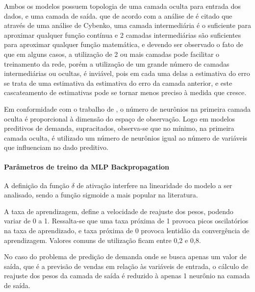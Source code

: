             Ambos os modelos possuem topologia de uma camada oculta para entrada dos dados, e uma camada de saída. que de acordo com  a análise de \cite{Braga2000}  é citado que através de uma análise de Cybenko, uma camada intermediária é o suficiente para aproximar qualquer função contínua e 2 camadas intermediárias são suficientes para aproximar qualquer função matemática, e devendo ser observado o fato de que em alguns casos, a utilização de 2 ou mais camadas pode facilitar o treinamento da rede, porém a utilização de um grande número de camadas intermediárias ou ocultas, é inviável, pois em cada uma delas a estimativa do erro se trata de uma estimativa da estimativa do erro da camada anterior, e este cascateamento de estimativas pode se tornar menos preciso à medida que cresce.
            
          Em conformidade com o trabalho de  \cite{Flavia2014}, o número de neurônios na primeira camada oculta é proporcional à dimensão do espaço de observação. Logo em modelos preditivos de demanda, supracitados, observa-se que no mínimo, na primeira camada oculta, é utilizado um número de neurônios igual ao número de variáveis que influenciam no dado preditivo.
            
            \paragraph*{Parâmetros de treino da MLP Backpropagation}
            A definição da função $\delta$ de ativação interfere na linearidade  do modelo a ser analisado, sendo a função sigmoide a mais popular na literatura. 
            
            A taxa de aprendizagem, define a velocidade de reajuste dos pesos, podendo variar de 0 a 1. Ressalta-se que uma taxa próxima de 1 provoca picos oscilatórios na taxa de aprendizado, e taxa próxima de 0 provoca lentidão da convergência de aprendizagem. Valores comuns de utilização ficam entre 0,2 e 0,8.
        
            No caso do problema de predição de demanda onde se busca apenas um valor de saída, que é a previsão de vendas em relação às variáveis de entrada, o cálculo de reajuste dos pesos da camada de saída é reduzido à apenas 1 neurônio na camada de saída.
            
